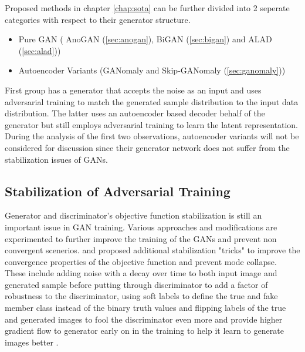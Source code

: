 Proposed methods in chapter \ref{chap:sota} can be further divided into 2 seperate categories with
respect to their generator structure. 
\begin{itemize}
	\item Pure GAN ( AnoGAN (\ref{sec:anogan}), BiGAN (\ref{sec:bigan}) and ALAD (\ref{sec:alad}))
	\item Autoencoder Variants (GANomaly and Skip-GANomaly (\ref{sec:ganomaly}))
\end{itemize}

First group has a generator that accepts the noise as an input and uses adversarial training to
match the generated sample distribution to the input data distribution. The latter uses an
autoencoder based decoder behalf of the generator but still employs adversarial training to learn
the latent representation. During the analysis of the first two observations, autoencoder variants
will not be considered for discussion since their generator network does not suffer from the
stabilization issues of GANs.

\subsection{Stabilization of Adversarial Training}

Generator and discriminator's objective function stabilization is still an important issue in GAN
training. Various approaches and modifications are experimented to further improve the training of
the GANs and prevent non convergent scenerios. \cite{methods} and \cite{fm} proposed additional
stabilization "tricks" to improve the convergence properties of the objective function and prevent
mode collapse. These include adding noise with a decay over time to both input image and generated
sample before putting through discriminator to add a factor of robustness to the discriminator,
using soft labels to define the true and fake member class instead of the binary truth values and
flipping labels of the true and generated images to fool the discriminator even more and provide
higher gradient flow to generator early on in the training to help it learn to generate images
better \cite{fm}.

